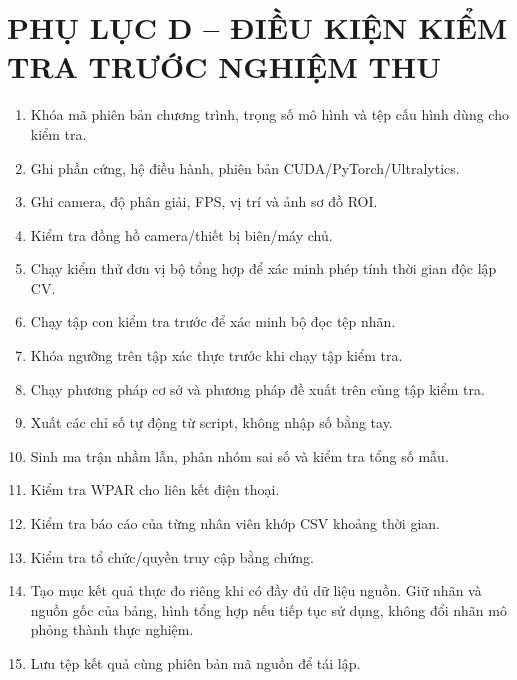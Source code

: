 \section*{PHỤ LỤC D -- ĐIỀU KIỆN KIỂM TRA TRƯỚC NGHIỆM THU}
\begin{enumerate}
\item Khóa mã phiên bản chương trình, trọng số mô hình và tệp cấu hình dùng cho kiểm tra.
\item Ghi phần cứng, hệ điều hành, phiên bản CUDA/PyTorch/Ultralytics.
\item Ghi camera, độ phân giải, FPS, vị trí và ảnh sơ đồ ROI.
\item Kiểm tra đồng hồ camera/thiết bị biên/máy chủ.
\item Chạy kiểm thử đơn vị bộ tổng hợp để xác minh phép tính thời gian độc lập CV.
\item Chạy tập con kiểm tra trước để xác minh bộ đọc tệp nhãn.
\item Khóa ngưỡng trên tập xác thực trước khi chạy tập kiểm tra.
\item Chạy phương pháp cơ sở và phương pháp đề xuất trên cùng tập kiểm tra.
\item Xuất các chỉ số tự động từ script, không nhập số bằng tay.
\item Sinh ma trận nhầm lẫn, phân nhóm sai số và kiểm tra tổng số mẫu.
\item Kiểm tra WPAR cho liên kết điện thoại.
\item Kiểm tra báo cáo của từng nhân viên khớp CSV khoảng thời gian.
\item Kiểm tra tổ chức/quyền truy cập bằng chứng.
\item Tạo mục kết quả thực đo riêng khi có đầy đủ dữ liệu nguồn. Giữ nhãn và nguồn gốc của bảng, hình tổng hợp nếu tiếp tục sử dụng, không đổi nhãn mô phỏng thành thực nghiệm.
\item Lưu tệp kết quả cùng phiên bản mã nguồn để tái lập.
\end{enumerate}



